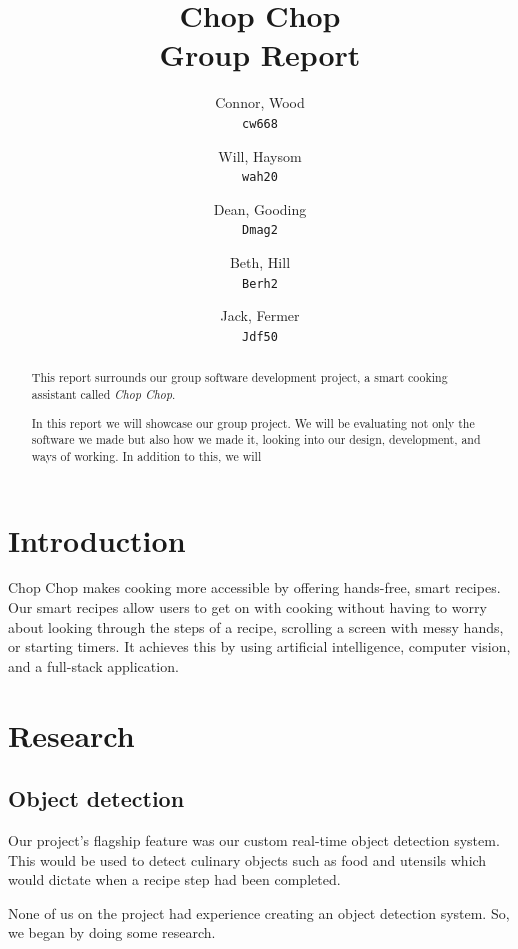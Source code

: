 \documentclass{article}
\title{%
Chop Chop \\
  \large Group Report}
\author{
  Connor, Wood\\
  \texttt{cw668}
  \and
  Will, Haysom\\
  \texttt{wah20}
  \and
  Dean, Gooding\\
  \texttt{Dmag2}
  \and
  Beth, Hill\\
  \texttt{Berh2}
  \and
  Jack, Fermer\\
  \texttt{Jdf50}
}
\begin{document}
\maketitle

\pagebreak

\linenumbers

\begin{abstract}
      This report surrounds our group software development project, a smart cooking assistant called \emph{Chop Chop}. 
    
      In this report we will showcase our group project. We will be evaluating not only the software we made but also how we made it, looking into our design, development, and ways of working. In addition to this, we will 
  \end{abstract}

  \pagebreak

  \tableofcontents

  \pagebreak



    \section{Introduction}
Chop Chop makes cooking more accessible by offering hands-free, smart recipes. Our smart recipes allow users to get on with cooking without having to worry about looking through the steps of a recipe, scrolling a screen with messy hands, or starting timers. It achieves this by using artificial intelligence, computer vision, and a full-stack application.

    \section{Research}
    \subsection{Object detection}
    Our project's flagship feature was our custom real-time object detection system. This would be used to detect culinary objects such as food and utensils which would dictate when a recipe step had been completed.
    
None of us on the project had experience creating an object detection system. So, we began by doing some research. 
\end{document}
